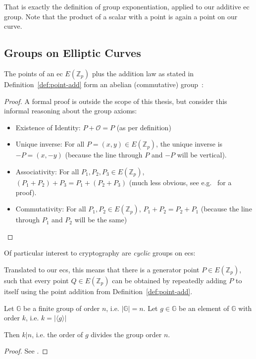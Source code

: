 That is exactly the definition of group exponentiation, applied to our additive \gls{ec} group. Note that the product of a scalar with a point is again a point on our curve.\\

\subsection{Groups on Elliptic Curves}
\begin{theorem}
    The points of an \gls{ec} $E(\mathbb{Z}_p)$ plus the addition law as stated in Definition~\ref{def:point-add} form an abelian (commutative) group~\cite{katz_introduction_2015, washington_elliptic_2008}:
\end{theorem}
\begin{proof}
    A formal proof is outside the scope of this thesis, but consider this informal reasoning about the group axioms:
    \begin{itemize}
        \item Existence of Identity: $P + \mathcal{O} = P$ (as per definition)
        \item Unique inverse: For all $P = (x,y) \in E(\mathbb{Z}_p)$, the unique inverse is $-P = (x, -y)$ (because the line through $P$ and $-P$ will be vertical).
        \item Associativity: For all $P_1, P_2, P_3 \in E(\mathbb{Z}_p)$, $(P_1 + P_2) + P_3 = P_1 + (P_2 + P_3)$ (much less obvious, see e.g.~\cite[chapter 2.4]{washington_elliptic_2008} for a proof).
        \item Commutativity: For all $P_1, P_2 \in E(\mathbb{Z}_p)$, $P_1 + P_2 = P_2 + P_1$ (because the line through $P_1$ and $P_2$ will be the same)
    \end{itemize}
\end{proof}

Of particular interest to cryptography are \emph{cyclic} groups on \glspl{ec}:


Translated to our \glspl{ec}, this means that there is a generator point $P \in E(\mathbb{Z}_p)$, such that every point $Q \in E(\mathbb{Z}_p)$ can be obtained by repeatedly adding $P$ to itself using the point addition from Definition~\ref{def:point-add}.

\begin{theorem}\cite{katz_introduction_2015}
    Let $\mathbb{G}$ be a finite group of order $n$, i.e. $|\mathbb{G}| = n$.
    Let $g \in \mathbb{G}$ be an element of $\mathbb{G}$ with order $k$, i.e. $k = |\langle g \rangle |$

    Then $k|n$, i.e. the order of $g$ divides the group order $n$.
\end{theorem}
\begin{proof}
    See \cite*[Proposition 8.54]{katz_introduction_2015}.
\end{proof}

